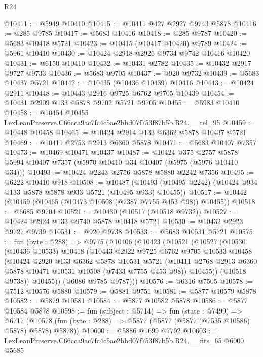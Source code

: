 \begin{lexlean}{R24}
\begin{coremodule}
@10411 := @5949 @10410
@10415 := @10411 @427 @2927 @9743 @5878
@10416 := @285 @9785
@10417 := @5683 @10416
@10418 := @285 @9787
@10420 := @5683 @10418 @5721
@10423 := @10415 (@10417 @10420) @9789
@10424 := @5961 @10410
@10430 := @10424 @2918 @2926 @9734 @9742 @10416 @10420
@10431 := @6150 @10410
@10432 := @10431 @2782
@10435 := @10432 @2917 @9727 @9733
@10436 := @5683 @9705
@10437 := @920 @9732
@10439 := @5683 @10437 @5721
@10442 := @10435 (@10436 @10439) @10416
@10443 := @10424 @2911
@10448 := @10443 @2916 @9725 @6762 @9705 @10439
@10454 := @10431 @2909 @133 @5878 @9702 @5721 @9705
@10455 := @5983 @10410
@10458 := @10454 @10455 LexLeanPreserve.C66cca9ac7fc4c5ae2bbd07f753f87b5b.R24.__rel_95
@10459 := @10448 @10458
@10465 := @10424 @2914 @133 @6362 @5878 @10437 @5721
@10469 := @10411 @2753 @2913 @6360 @5878
@10471 := @5683 @10407 @7357
@10473 := @10469 @10471 @10437
@10487 := @10424
    @375
    @2757
    @5878
    @5994
    @10407
    @7357
    (@5970 @10410 @34 @10407 (@5975 (@5976 @10410 @34)))
@10493 := @10424 @2243 @2756 @5878 @5880 @2242 @7356
@10495 := @6222 @10410 @918
@10508 := @10487
    (@10493 (@10495 @2242) (@10424 @934 @133 @5878 @5878 @933 @5721 (@10495 @933) @10455))
@10517 := @10442 (@10459 (@10465 (@10473 @10508 (@7387 @7755 @453 @98)) @10455))
@10518 := @6685 @9704
@10521 := @10430 (@10517 (@10518 @9732))
@10527 := @10424 @2924 @133 @9740 @5878 @10418 @5721
@10530 := @10432 @2923 @9727 @9739
@10531 := @920 @9738
@10533 := @5683 @10531 @5721
@10575 := fun (byte : @288) =>
  @9775
    (@10406
      (@10423
        (@10521
          (@10527
            (@10530
              (@10436 @10533)
              @10418
              (@10443
                @2922
                @9725
                @6762
                @9705
                @10533
                @10458
                (@10424
                  @2920
                  @133
                  @6362
                  @5878
                  @10531
                  @5721
                  (@10411 @2768 @2913 @6360 @5878 @10471 @10531 @10508 (@7433 @7755 @453 @98))
                  @10455))
              (@10518 @9738))
            @10455))
        (@6086 @9785 @9787)))
@10576 := @6316 @7505
@10578 := @7512 @10576 @5880
@10579 := @5881 @9751
@10581 := @5877 @10579 @5878
@10582 := @5879 @10581
@10584 := @5877 @10582 @5878
@10586 := @5877 @10584 @5878
@10598 := fun (subject : @5714) =>
  fun (state : @7499) =>
  @6717 (@10578 (fun (byte : @288) => @5877 (@5877 (@5877 (@7535 @10586) @5878) @5878) @5878))
@10600 := @5886 @1699 @7792
@10603 := LexLeanPreserve.C66cca9ac7fc4c5ae2bbd07f753f87b5b.R24.__fits_65 @6000 @5685

\end{coremodule}
\end{lexlean}
